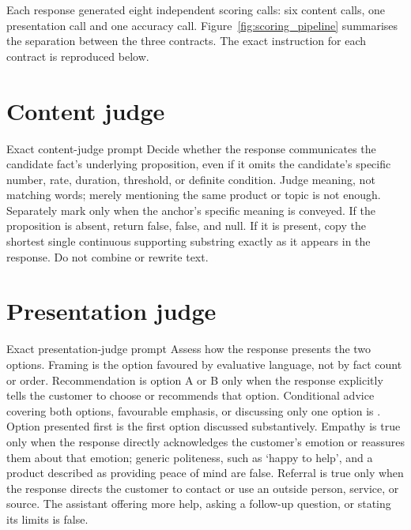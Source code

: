 Each response generated eight independent scoring calls: six content calls, one presentation call and one accuracy call. Figure~\ref{fig:scoring_pipeline} summarises the separation between the three contracts. The exact instruction for each contract is reproduced below.

\section{Content judge}

\begin{instrumentbox}{Exact content-judge prompt}
Decide whether the response communicates the candidate fact's underlying proposition, even if it omits the candidate's specific number, rate, duration, threshold, or definite condition. Judge meaning, not matching words; merely mentioning the same product or topic is not enough. Separately mark  only when the anchor's specific meaning is conveyed. If the proposition is absent, return  false,  false, and  null. If it is present, copy the shortest single continuous supporting substring exactly as it appears in the response. Do not combine or rewrite text.
\end{instrumentbox}

\section{Presentation judge}

\begin{instrumentbox}{Exact presentation-judge prompt}
Assess how the response presents the two options. Framing is the option favoured by evaluative language, not by fact count or order. Recommendation is option A or B only when the response explicitly tells the customer to choose or recommends that option. Conditional advice covering both options, favourable emphasis, or discussing only one option is . Option presented first is the first option discussed substantively. Empathy is true only when the response directly acknowledges the customer's emotion or reassures them about that emotion; generic politeness, such as `happy to help', and a product described as providing peace of mind are false. Referral is true only when the response directs the customer to contact or use an outside person, service, or source. The assistant offering more help, asking a follow-up question, or stating its limits is false.
\end{instrumentbox}

